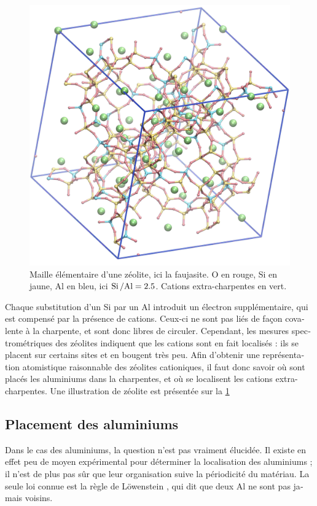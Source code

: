 \documentclass[thesis]{subfiles}
\begin{document}
\begin{otherlanguage}{french}
\begin{figure}[ht]
	\centering
	\includegraphics[width=0.8\linewidth]{figures/cations/FAU2.5_framework_Na.jpg}
	\caption{Maille élémentaire d'une zéolite, ici la faujasite. O en rouge, Si en jaune, Al en bleu, ici $\mbox{Si\,/Al} = 2.5$. Cations extra-charpentes  en vert.}\label{fig_FAU25}
\end{figure}

Chaque substitution d'un Si par un Al introduit un électron supplémentaire, qui est compensé par la présence de cations. Ceux-ci ne sont pas liés de façon covalente à la charpente, et sont donc libres de circuler. Cependant, les mesures spectrométriques des zéolites indiquent que les cations sont en fait localisés : ils se placent sur certains sites et en bougent très peu. Afin d'obtenir une représentation atomistique raisonnable des zéolites cationiques, il faut donc savoir où sont placés les aluminiums dans la charpentes, et où se localisent les cations extra-charpentes. Une illustration de zéolite est présentée sur la \cref{fig_FAU25}

\subsection{Placement des aluminiums}

Dans le cas des aluminiums, la question n'est pas vraiment élucidée. Il existe en effet peu de moyen expérimental pour déterminer la localisation des aluminiums ; il n'est de plus pas sûr que leur organisation suive la périodicité du matériau. La seule loi connue est la règle de L\"owenstein \autocite{Loewenstein}, qui dit que deux Al ne sont pas jamais voisins.


\end{otherlanguage}
\end{document}
